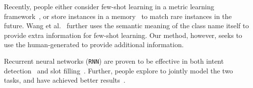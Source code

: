 Recently, people either consider few-shot learning in a metric learning framework~\cite{koch2015siamese,vinyals2016matching}, or store instances in a memory~\cite{santoro2016meta, kaiser2017learning} to match rare instances in the future.
Wang et al.~ further uses the semantic meaning of the class name itself to provide extra information for few-shot learning.
Our method, however, seeks to use the human-generated \RE to provide additional information.

Recurrent neural networks (\texttt{RNN}) are proven to be effective in both intent detection~\cite{ravuri2015comparative} and slot filling~\cite{mesnil2015using}.
Further, people explore to jointly model the two tasks, and have achieved better results~\cite{liu2016attention, zhang2016joint}.



